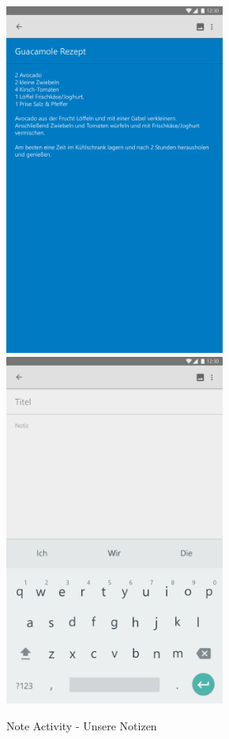 \begin{figure}[H]
	\caption{Note Activity - Unsere Notizen}
	\centering
	\includegraphics[width=7.25cm]{img/NoteActivity.pdf}
	\includegraphics[width=7.25cm]{img/NoteActivityNew.pdf}

\end{figure}
